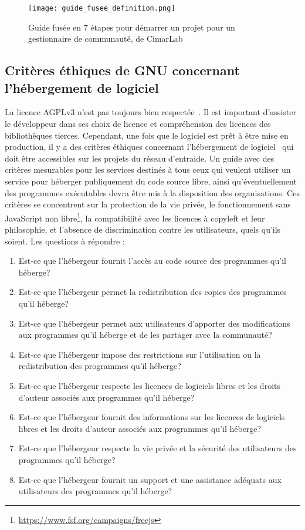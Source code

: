
\begin{figure}[htb]
\centering
\texttt{[image: guide\_fusee\_definition.png]}
\caption{Guide fusée en 7 étapes pour démarrer un projet pour un gestionnaire de communauté, de CimarLab~\cite{guide_fusee}}
\label{fig:guide_fusee}
\end{figure}

\subsection{Critères éthiques de GNU concernant l'hébergement de logiciel}

La licence AGPLv3 n’est pas toujours bien respectée~\cite{violation_libre_2017}. Il est important d'assister le développeur dans ses choix de licence et compréhension des licences des bibliothèques tierces. Cependant, une fois que le logiciel est prêt à être mise en production, il y a des critères éthiques concernant l'hébergement de logiciel~\cite{gnu_critere_hebergement_2022} qui doit être accessibles sur les projets du réseau d’entraide. Un guide avec des critères mesurables pour les services destinés à tous ceux qui veulent utiliser un service pour héberger publiquement du code source libre, ainsi qu'éventuellement des programmes exécutables devra être mis à la disposition des organisations. Ces critères se concentrent sur la protection de la vie privée, le fonctionnement sans JavaScript non libre\footnote{\url{https://www.fsf.org/campaigns/freejs}}, la compatibilité avec les licences à copyleft et leur philosophie, et l'absence de discrimination contre les utilisateurs, quels qu'ils soient.  Les questions à répondre : 

\begin{enumerate}
    \item Est-ce que l'hébergeur fournit l'accès au code source des programmes qu'il héberge?
    \item Est-ce que l'hébergeur permet la redistribution des copies des programmes qu'il héberge?
    \item Est-ce que l'hébergeur permet aux utilisateurs d'apporter des modifications aux programmes qu'il héberge et de les partager avec la communauté?
    \item Est-ce que l'hébergeur impose des restrictions sur l'utilisation ou la redistribution des programmes qu'il héberge?
    \item Est-ce que l'hébergeur respecte les licences de logiciels libres et les droits d'auteur associés aux programmes qu'il héberge?
    \item Est-ce que l'hébergeur fournit des informations sur les licences de logiciels libres et les droits d'auteur associés aux programmes qu'il héberge?
    \item Est-ce que l'hébergeur respecte la vie privée et la sécurité des utilisateurs des programmes qu'il héberge?
    \item Est-ce que l'hébergeur fournit un support et une assistance adéquats aux utilisateurs des programmes qu'il héberge?
\end{enumerate}

